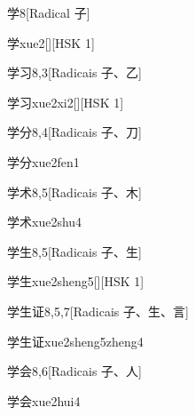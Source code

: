 \begin{entry}{学}{8}[Radical ⼦]
  \begin{phonetics}{学}{xue2}[][HSK 1]
  \end{phonetics}
\end{entry}

\begin{entry}{学习}{8,3}[Radicais ⼦、⼄]
  \begin{phonetics}{学习}{xue2xi2}[][HSK 1]
  \end{phonetics}
\end{entry}

\begin{entry}{学分}{8,4}[Radicais ⼦、⼑]
  \begin{phonetics}{学分}{xue2fen1}
  \end{phonetics}
\end{entry}

\begin{entry}{学术}{8,5}[Radicais ⼦、⽊]
  \begin{phonetics}{学术}{xue2shu4}
  \end{phonetics}
\end{entry}

\begin{entry}{学生}{8,5}[Radicais ⼦、⽣]
  \begin{phonetics}{学生}{xue2sheng5}[][HSK 1]
  \end{phonetics}
\end{entry}

\begin{entry}{学生证}{8,5,7}[Radicais ⼦、⽣、⾔]
  \begin{phonetics}{学生证}{xue2sheng5zheng4}
  \end{phonetics}
\end{entry}

\begin{entry}{学会}{8,6}[Radicais ⼦、⼈]
  \begin{phonetics}{学会}{xue2hui4}
  \end{phonetics}
\end{entry}

